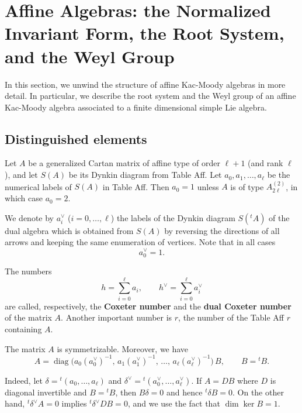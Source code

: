 \documentclass[12pt]{article}
\begin{document}
\section{Affine Algebras: the Normalized Invariant Form, the Root System, and the Weyl Group}
In this section, we unwind the structure of affine Kac-Moody algebras in more detail. In particular, we describe the root system and the Weyl group of an affine Kac-Moody algebra associated to a finite dimensional simple Lie algebra.

\subsection{Distinguished elements}
Let $A$ be a generalized Cartan matrix of affine type of order $\ell+1$
(and rank $\ell$), and let $S(A)$ be its Dynkin diagram from Table Aff.
Let $a_0,a_1,\dots,a_\ell$ be the numerical labels of $S(A)$ in Table Aff.
Then $a_0=1$ unless $A$ is of type $A_{2\ell}^{(2)}$, in which case $a_0=2$.

We denote by $a_i^\vee$ ($i=0,\dots,\ell$) the labels of the Dynkin diagram
$S({}^tA)$ of the dual algebra which is obtained from $S(A)$ by reversing the
directions of all arrows and keeping the same enumeration of vertices.
Note that in all cases
\[
    a_0^\vee = 1.
\]

\begin{definition}
    The numbers
    \[
        h = \sum_{i=0}^\ell a_i,
        \qquad
        h^\vee = \sum_{i=0}^\ell a_i^\vee
    \]
    are called, respectively, the \textbf{Coxeter number} and the
    \textbf{dual Coxeter number} of the matrix $A$. Another important number is $r$, the number of the Table Aff $r$ containing $A$.
\end{definition}

The matrix $A$ is symmetrizable. Moreover, we have
\begin{equation}
    A = \operatorname{diag}\!\big(a_0 (a_0^\vee)^{-1},\,
    a_1 (a_1^\vee)^{-1},\,\dots,\,
    a_\ell (a_\ell^\vee)^{-1}\big)\, B,
    \qquad B = {}^tB.
\end{equation}

Indeed, let $\delta = {}^t(a_0,\dots,a_\ell)$ and
$\delta^\vee = {}^t(a_0^\vee,\dots,a_\ell^\vee)$.
If $A = DB$ where $D$ is diagonal invertible and $B={}^tB$, then
$B\delta = 0$ and hence ${}^t\delta B=0$. On the other hand,
${}^t\delta^\vee A=0$ implies ${}^t\delta^\vee DB=0$, and we use the fact that
$\dim\ker B = 1$.
\end{document}
